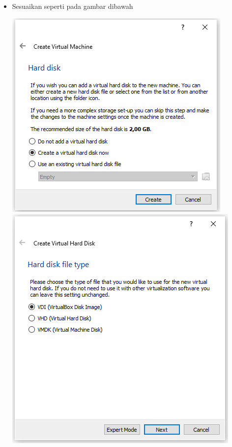\documentclass{article}
\begin{document}
\begin{flushleft}
\begin{itemize}
			\item Sesuaikan seperti pada gambar dibawah \\
        		\begin{center}
        			\includegraphics[scale=0.6]{(4)} \\
        			\includegraphics[scale=0.6]{(5)} \\  

\end{center}
\end{itemize}
\end{flushleft}
\end{document}
